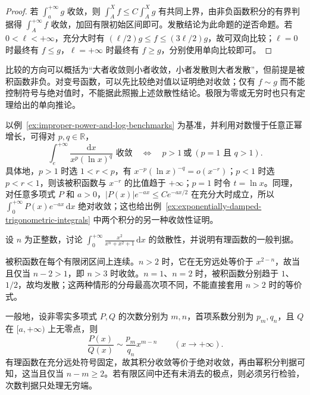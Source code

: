 \begin{proof}
若 $\int_a^{+\infty}g$ 收敛，则 $\int_A^Xf\leq C\int_A^Xg$ 有共同上界，由非负函数积分的有界判据得 $\int_A^{+\infty}f$ 收敛，加回有限初始区间即可。发散结论为此命题的逆否命题。若 $0<\ell<+\infty$，充分大时有 $(\ell/2)g\leq f\leq(3\ell/2)g$，故可双向比较；$\ell=0$ 时最终有 $f\leq g$，$\ell=+\infty$ 时最终有 $f\geq g$，分别使用单向比较即可。
\end{proof}

比较的方向可以概括为“大者收敛则小者收敛，小者发散则大者发散”，但前提是被积函数非负。对变号函数，可以先比较绝对值以证明绝对收敛；仅有 $f\sim g$ 而不能控制符号与绝对值时，不能据此照搬上述敛散性结论。极限为零或无穷时也只有定理给出的单向推论。

以例~\ref{ex:improper-power-and-log-benchmarks} 为基准，并利用对数慢于任意正幂增长，可得对 $p,q\in\mathbb{R}$，
\begin{equation}
    \int_e^{+\infty}\frac{\mathrm{d}x}{x^p(\ln x)^q}
    \text{ 收敛}\quad\Longleftrightarrow\quad
    p>1\ \text{或}\ (p=1\text{ 且 }q>1).
    \label{eq:power-log-infinite-integral-test}
\end{equation}
具体地，$p>1$ 时选 $1<r<p$，有 $x^{-p}(\ln x)^{-q}=o(x^{-r})$；$p<1$ 时选 $p<r<1$，则该被积函数与 $x^{-r}$ 的比值趋于 $+\infty$；$p=1$ 时令 $t=\ln x$。同理，对任意多项式 $P$ 和 $a>0$，$|P(x)|e^{-ax}\leq Ce^{-ax/2}$ 在充分大时成立，所以 $\int_0^{+\infty}P(x)e^{-ax}\,\mathrm{d}x$ 绝对收敛；这也给出例~\ref{ex:exponentially-damped-trigonometric-integrals} 中两个积分的另一种收敛性证明。

\begin{example}
\label{ex:rational-infinite-integral-degree-test}
设 $n$ 为正整数，讨论 $\int_0^{+\infty}\frac{x^2}{x^n+x^2+1}\,\mathrm{d}x$ 的敛散性，并说明有理函数的一般判据。
\end{example}

\begin{solve}
被积函数在每个有限闭区间上连续。$n>2$ 时，它在无穷远处等价于 $x^{2-n}$，故当且仅当 $n-2>1$，即 $n>3$ 时收敛。$n=1$、$n=2$ 时，被积函数分别趋于 $1$、$1/2$，故均发散；这两种情形的分母最高次项不同，不能直接套用 $n>2$ 时的等价式。

一般地，设非零实多项式 $P,Q$ 的次数分别为 $m,n$，首项系数分别为 $p_m,q_n$，且 $Q$ 在 $[a,+\infty)$ 上无零点，则
\[
    \frac{P(x)}{Q(x)}\sim\frac{p_m}{q_n}x^{m-n}
    \qquad(x\to+\infty).
\]
有理函数在充分远处符号固定，故其积分收敛等价于绝对收敛，再由幂积分判据可知，这当且仅当 $n-m\geq2$。若有限区间中还有未消去的极点，则必须另行检验，次数判据只处理无穷端。
\end{solve}

